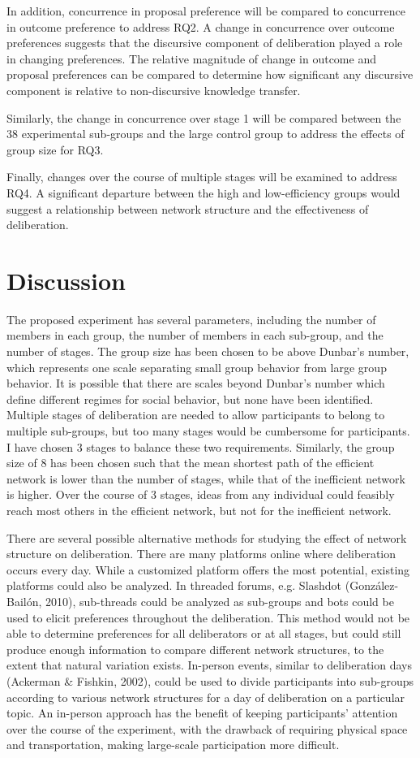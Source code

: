 In addition, concurrence in proposal preference will be compared to concurrence in outcome preference to address RQ2. A change in concurrence over outcome preferences suggests that the discursive component of deliberation played a role in changing preferences. The relative magnitude of change in outcome and proposal preferences can be compared to determine how significant any discursive component is relative to non-discursive knowledge transfer.

Similarly, the change in concurrence over stage 1 will be compared between the 38 experimental sub-groups and the large control group to address the effects of group size for RQ3.

Finally, changes over the course of multiple stages will be examined to address RQ4. A significant departure between the high and low-efficiency groups would suggest a relationship between network structure and the effectiveness of deliberation.

\section{Discussion}
The proposed experiment has several parameters, including the number of members in each group, the number of members in each sub-group, and the number of stages. The group size has been chosen to be above Dunbar’s number, which represents one scale separating small group behavior from large group behavior. It is possible that there are scales beyond Dunbar’s number which define different regimes for social behavior, but none have been identified. Multiple stages of deliberation are needed to allow participants to belong to multiple sub-groups, but too many stages would be cumbersome for participants. I have chosen 3 stages to balance these two requirements. Similarly, the group size of 8 has been chosen such that the mean shortest path of the efficient network is lower than the number of stages, while that of the inefficient network is higher. Over the course of 3 stages, ideas from any individual could feasibly reach most others in the efficient network, but not for the inefficient network.

There are several possible alternative methods for studying the effect of network structure on deliberation. There are many platforms online where deliberation occurs every day. While a customized platform offers the most potential, existing platforms could also be analyzed. In threaded forums, e.g. Slashdot (Gonz\'alez-Bail\'on, 2010), sub-threads could be analyzed as sub-groups and bots could be used to elicit preferences throughout the deliberation. This method would not be able to determine preferences for all deliberators or at all stages, but could still produce enough information to compare different network structures, to the extent that natural variation exists. In-person events, similar to deliberation days (Ackerman \& Fishkin, 2002), could be used to divide participants into sub-groups according to various network structures for a day of deliberation on a particular topic. An in-person approach has the benefit of keeping participants’ attention over the course of the experiment, with the drawback of requiring physical space and transportation, making large-scale participation more difficult.
